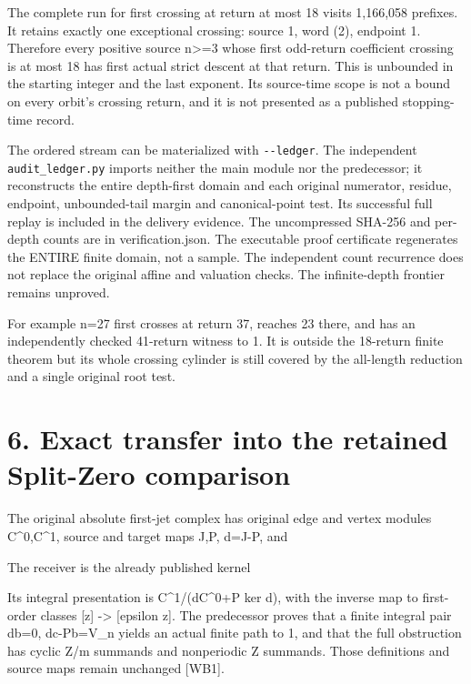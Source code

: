 The complete run for first crossing at return at most 18 visits
1,166,058 prefixes. It retains exactly one exceptional crossing: source
1, word (2), endpoint 1. Therefore every positive source n\textgreater=3
whose first odd-return coefficient crossing is at most 18 has first
actual strict descent at that return. This is unbounded in the starting
integer and the last exponent. Its source-time scope is not a bound on
every orbit's crossing return, and it is not presented as a published
stopping-time record.

The ordered stream can be materialized with \nolinkurl{--ledger}. The
independent \nolinkurl{audit_ledger.py} imports neither the main module
nor the predecessor; it reconstructs the entire depth-first domain and
each original numerator, residue, endpoint, unbounded-tail margin and
canonical-point test. Its successful full replay is included in the
delivery evidence. The uncompressed SHA-256 and per-depth counts are in
verification.json. The executable proof certificate regenerates the
ENTIRE finite domain, not a sample. The independent count recurrence
does not replace the original affine and valuation checks. The
infinite-depth frontier remains unproved.

For example n=27 first crosses at return 37, reaches 23 there, and has
an independently checked 41-return witness to 1. It is outside the
18-return finite theorem but its whole crossing cylinder is still
covered by the all-length reduction and a single original root test.

\section{6. Exact transfer into the retained Split-Zero comparison}

The original absolute first-jet complex has original edge and vertex
modules C\^{}0,C\^{}1, source and target maps J,P, d=J-P, and


The receiver is the already published kernel


Its integral presentation is C\^{}1/(dC\^{}0+P ker d), with the inverse
map to first-order classes {[}z{]} -\textgreater{} {[}epsilon z{]}. The
predecessor proves that a finite integral pair db=0, dc-Pb=V\_n yields
an actual finite path to 1, and that the full obstruction has cyclic Z/m
summands and nonperiodic Z summands. Those definitions and source maps
remain unchanged {[}WB1{]}.

